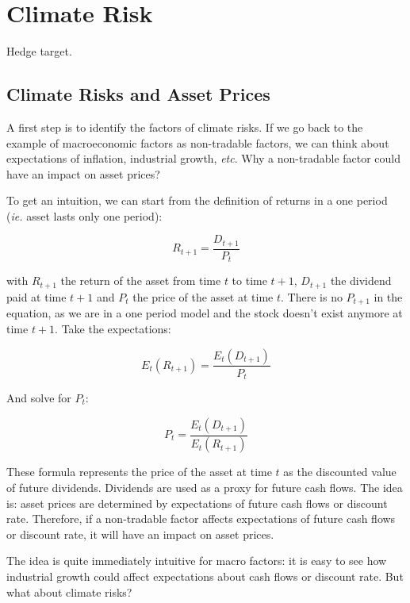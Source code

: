 \chapter{Climate Risk}


Hedge target.


\section{Climate Risks and Asset Prices}

A first step is to identify the factors of climate risks.
If we go back to the example of macroeconomic factors 
as non-tradable factors, we can think about expectations 
of inflation, industrial growth, \textit{etc}. 
Why a non-tradable factor could have an impact on asset prices?

To get an intuition, we can start from the definition of 
returns in a one period  (\textit{ie.} asset lasts only one period):

\begin{equation}
    R_{t+1} = \frac{D_{t+1}}{P_t}
\end{equation}

with $R_{t+1}$ the return of the asset from time $t$ to time $t+1$, 
$D_{t+1}$ the dividend paid at time $t+1$ 
and $P_t$ the price of the asset at time $t$.
There is no $P_{t+1}$ in the equation, 
as we are in a one period model and 
the stock doesn't exist anymore at time $t+1$. Take the expectations:

\begin{equation}
    E_t(R_{t+1}) = \frac{E_t(D_{t+1})}{P_t}
\end{equation}

And solve for $P_t$:

\begin{equation}
    P_t = \frac{E_t(D_{t+1})}{E_t(R_{t+1})}
\end{equation}

These formula 
represents the price of the asset at time $t$ 
as the discounted value of future dividends.
Dividends are used as a proxy for future cash flows.
The idea is: asset prices are determined by
expectations of future cash flows or discount rate.
Therefore, if a non-tradable factor affects
expectations of future cash flows or discount rate,
it will have an impact on asset prices.

The idea is quite immediately intuitive for macro factors:
it is easy to see how industrial growth
could affect expectations about cash flows or discount rate. 
But what about climate risks?


